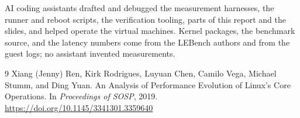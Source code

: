 \documentclass[11pt]{article}
\begin{document}
AI coding assistants drafted and debugged the measurement harnesses, the runner and reboot scripts, the verification tooling, parts of this report and the slides, and helped operate the virtual machines. Kernel packages, the benchmark source, and the latency numbers come from the LEBench authors and from the guest logs; no assistant invented measurements.

\begin{thebibliography}{9}
Xiang (Jenny) Ren, Kirk Rodrigues, Luyuan Chen, Camilo Vega, Michael Stumm, and Ding Yuan.
An Analysis of Performance Evolution of Linux's Core Operations.
In \emph{Proceedings of SOSP}, 2019.
\url{https://doi.org/10.1145/3341301.3359640}
\end{thebibliography}
\end{document}
